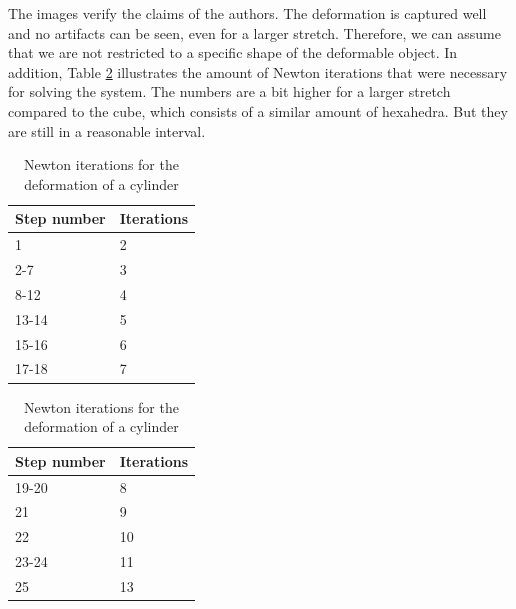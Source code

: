 The images verify the claims of the authors. The deformation is captured well and no artifacts can be seen, even for a larger stretch. Therefore, we can assume that we are not restricted to a specific shape of the deformable object. In addition, Table \ref{table:cylinder} illustrates the amount of Newton iterations that were necessary for solving the system. The numbers are a bit higher for a larger stretch compared to the cube, which consists of a similar amount of hexahedra. But they are still in a reasonable interval. 

\begin{table}[!htbp]
\parbox{.45\linewidth}{
\centering
\begin{tabular}{ | l | l |}
\hline
\textbf{Step number} & \textbf{Iterations} \\ \hline
1 & 2 \\ \hline
2-7 & 3 \\ \hline
8-12 & 4 \\ \hline
13-14 & 5 \\ \hline
15-16 & 6 \\ \hline
17-18 & 7 \\ \hline
\end{tabular}
}
\hfill
\parbox{.45\linewidth}{
\centering
\begin{tabular}{ | l | l |}
\hline
\textbf{Step number} & \textbf{Iterations} \\ \hline
19-20 & 8 \\ \hline
21 & 9 \\ \hline
22 & 10 \\ \hline
23-24 & 11 \\ \hline
25 & 13 \\ \hline
\end{tabular}
}
\caption{Newton iterations for the deformation of a cylinder}
\label{table:cylinder}
\end{table}

